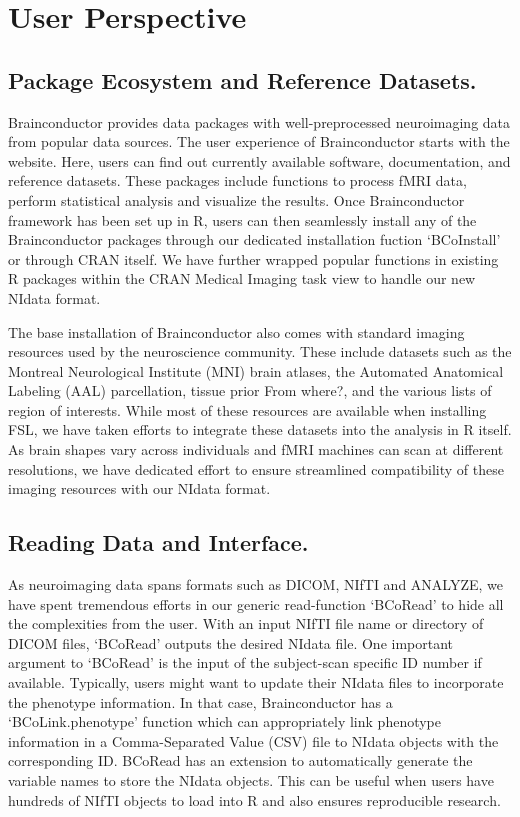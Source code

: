 \documentclass{nature}
\begin{document}
\section{User Perspective}


\subsection{Package Ecosystem and Reference Datasets.}
Brainconductor provides data packages with well-preprocessed neuroimaging data
from popular data sources.
The user experience of Brainconductor starts with the website. Here, users can
find out currently available software, documentation, and reference datasets.
These packages include functions to process fMRI data, perform statistical
analysis and visualize the results.
Once Brainconductor framework has been set up in R, users can then
seamlessly install any of the Brainconductor packages through our
dedicated installation fuction `BCoInstall' or through CRAN itself.
We have further wrapped popular functions in existing R packages
within the CRAN Medical Imaging task view to handle our new NIdata format.


The base installation of Brainconductor also comes with standard imaging
resources
used by the neuroscience community. These include datasets such
as the Montreal Neurological
Institute (MNI) brain atlases, the Automated Anatomical Labeling (AAL)
parcellation\cite{tzourio2002automated},
tissue prior {\color{red}From where?},
and the various lists of region of interests. While most of these
resources are available when installing FSL, we have taken
efforts to integrate these datasets into the analysis in R itself.
As brain shapes vary across individuals
and fMRI machines can scan at different resolutions, we have
dedicated effort
to ensure streamlined compatibility of these imaging resources with our NIdata
format.

\subsection{Reading Data and Interface.}
As neuroimaging data spans formats such as DICOM, NIfTI and ANALYZE, we have
spent tremendous efforts in our generic read-function `BCoRead' to hide
all the complexities from the user. With an input NIfTI file name or directory of
DICOM files, `BCoRead' outputs the desired NIdata
file.
One important argument to `BCoRead' is the input of the subject-scan specific ID
number if available. 
Typically, users might want to update their NIdata files to incorporate the
phenotype information. In that case, Brainconductor has a `BCoLink.phenotype'
function
which can appropriately link phenotype information in a Comma-Separated Value
(CSV) file to NIdata objects with the corresponding ID. 
BCoRead has an extension to automatically generate the variable names to store
the NIdata objects. This can be useful when users have hundreds of NIfTI
objects to load into R and also ensures reproducible research.
\end{document}
